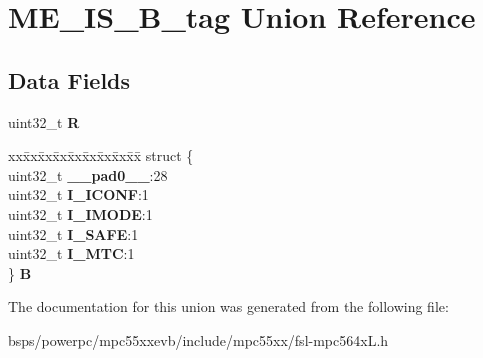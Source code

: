 \hypertarget{unionME__IS__32B__tag}{}\section{M\+E\+\_\+\+I\+S\+\_\+B\+\_\+tag Union Reference}
\label{unionME__IS__32B__tag}
\subsection*{Data Fields}
\begin{DoxyCompactItemize}
\item 
\mbox{\label{unionME__IS__32B__tag_a14184282686085dde8cc46f4ac1865b2}} 
uint32\+\_\+t {\bfseries R}
\item 
\mbox{\label{unionME__IS__32B__tag_ad992755541a1d5c789c74a04b20fea00}} 
\begin{tabbing}
xx\=xx\=xx\=xx\=xx\=xx\=xx\=xx\=xx\=\kill
struct \{\\
\>uint32\_t {\bfseries \_\_pad0\_\_}:28\\
\>uint32\_t {\bfseries I\_ICONF}:1\\
\>uint32\_t {\bfseries I\_IMODE}:1\\
\>uint32\_t {\bfseries I\_SAFE}:1\\
\>uint32\_t {\bfseries I\_MTC}:1\\
\} {\bfseries B}\\

\end{tabbing}\end{DoxyCompactItemize}


The documentation for this union was generated from the following file\+:\begin{DoxyCompactItemize}
\item 
bsps/powerpc/mpc55xxevb/include/mpc55xx/fsl-\/mpc564x\+L.\+h\end{DoxyCompactItemize}
